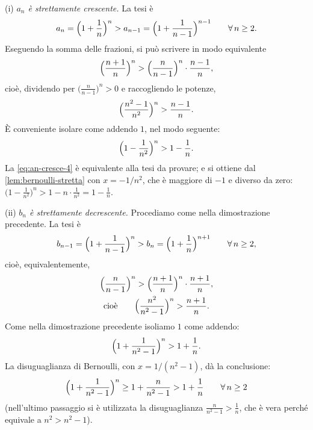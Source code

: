 \begin{dimostrazione}
(i) \emph{$a_{n}$ è strettamente crescente.} La tesi è
\begin{equation}\label{eq:an-cresce-1}
  a_{n}=\Bigl(1+\frac1n\Bigr)^{n}>a_{n-1}=\Bigl(1+\frac1{n-1}\Bigr)^{n-1} \qquad\forall\, n\ge2 .
\end{equation}
Eseguendo la somma delle frazioni, si può scrivere in modo equivalente
\begin{equation}\label{eq:an-cresce-2}
  \Bigl(\frac{n+1}{n}\Bigr)^{n}>\Bigl(\frac{n}{n-1}\Bigr)^{n}\cdot\frac{n-1}{n},
\end{equation}
cioè, dividendo per $\bigl(\frac{n}{n-1}\bigr)^{n}>0$ e raccogliendo le potenze,
\begin{equation}\label{eq:an-cresce-3}
  \Bigl(\frac{n^{2}-1}{n^{2}}\Bigr)^{n}>\frac{n-1}{n}.
\end{equation}
È conveniente isolare come addendo $1$, nel modo seguente:
\begin{equation}\label{eq:an-cresce-4}
  \Bigl(1-\frac1{n^{2}}\Bigr)^{n}>1-\frac1n .
\end{equation}
La \eqref{eq:an-cresce-4} è equivalente alla tesi da provare; e si ottiene dal
\cref{lem:bernoulli-stretta} con $x=-1/n^{2}$, che è maggiore di $-1$ e diverso da zero:
$\bigl(1-\frac1{n^{2}}\bigr)^{n}>1-n\cdot\frac1{n^{2}}=1-\frac1n$.

(ii) \emph{$b_{n}$ è strettamente decrescente.} Procediamo come nella dimostrazione
precedente. La tesi è
\begin{equation}\label{eq:bn-decresce-1}
  b_{n-1}=\Bigl(1+\frac1{n-1}\Bigr)^{n}>b_{n}=\Bigl(1+\frac1n\Bigr)^{n+1} \qquad\forall\, n\ge2,
\end{equation}
cioè, equivalentemente,
\begin{equation}\label{eq:bn-decresce-2}
\begin{gathered}
  \Bigl(\frac{n}{n-1}\Bigr)^{n}>\Bigl(\frac{n+1}{n}\Bigr)^{n}\cdot\frac{n+1}{n},\\
  \text{cioè}\qquad\Bigl(\frac{n^{2}}{n^{2}-1}\Bigr)^{n}>\frac{n+1}{n}.
\end{gathered}
\end{equation}
Come nella dimostrazione precedente isoliamo $1$ come addendo:
\begin{equation}\label{eq:bn-decresce-3}
  \Bigl(1+\frac1{n^{2}-1}\Bigr)^{n}>1+\frac1n .
\end{equation}
La disuguaglianza di Bernoulli, con $x=1/(n^{2}-1)$, dà la conclusione:
\begin{equation}\label{eq:bn-decresce-4}
  \Bigl(1+\frac1{n^{2}-1}\Bigr)^{n}\ge1+\frac{n}{n^{2}-1}>1+\frac1n \qquad\forall\, n\ge2
\end{equation}
(nell'ultimo passaggio si è utilizzata la disuguaglianza $\frac{n}{n^{2}-1}>\frac1n$, che
è vera perché equivale a $n^{2}>n^{2}-1$).


\end{dimostrazione}
